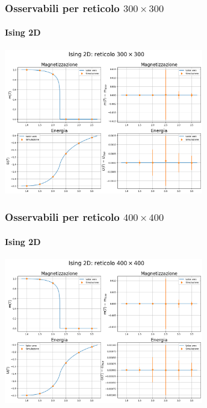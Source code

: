 \begin{frame}
    \frametitle{Osservabili per reticolo $300 \times 300$}
    \framesubtitle{Ising 2D}

    \centering
    \includegraphics[width=0.65\textwidth]{Immagini/backupIsing2D/obs_300.png}

\end{frame}



\begin{frame}
    \frametitle{Osservabili per reticolo $400 \times 400$}
    \framesubtitle{Ising 2D}

    \centering
    \includegraphics[width=0.65\textwidth]{Immagini/backupIsing2D/obs_400.png}

\end{frame}



